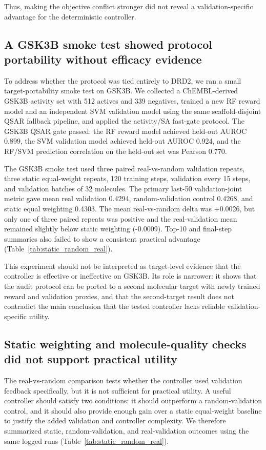 \documentclass[referee,lineno,pdflatex,sn-basic]{sn-jnl}
\theoremstyle{thmstyleone}%
\theoremstyle{thmstyletwo}%
\theoremstyle{thmstylethree}%
\begin{document}
Thus, making the objective conflict stronger did not reveal a validation-specific advantage for the deterministic controller.

\subsection{A GSK3B smoke test showed protocol portability without efficacy evidence}\label{subsec:gsk3b_smoke}

To address whether the protocol was tied entirely to DRD2, we ran a small target-portability smoke test on GSK3B. We collected a ChEMBL-derived GSK3B activity set with 512 actives and 339 negatives, trained a new RF reward model and an independent SVM validation model using the same scaffold-disjoint QSAR fallback pipeline, and applied the activity/SA fast-gate protocol. The GSK3B QSAR gate passed: the RF reward model achieved held-out AUROC 0.899, the SVM validation model achieved held-out AUROC 0.924, and the RF/SVM prediction correlation on the held-out set was Pearson 0.770.

The GSK3B smoke test used three paired real-vs-random validation repeats, three static equal-weight repeats, 120 training steps, validation every 15 steps, and validation batches of 32 molecules. The primary last-50 validation-joint metric gave mean real validation 0.4294, random-validation control 0.4268, and static equal weighting 0.4303. The mean real-vs-random delta was +0.0026, but only one of three paired repeats was positive and the real-validation mean remained slightly below static weighting (-0.0009). Top-10 and final-step summaries also failed to show a consistent practical advantage (Table~\ref{tab:static_random_real}).

This experiment should not be interpreted as target-level evidence that the controller is effective or ineffective on GSK3B. Its role is narrower: it shows that the audit protocol can be ported to a second molecular target with newly trained reward and validation proxies, and that the second-target result does not contradict the main conclusion that the tested controller lacks reliable validation-specific utility.

\subsection{Static weighting and molecule-quality checks did not support practical utility}\label{subsec:static_quality}

The real-vs-random comparison tests whether the controller used validation feedback specifically, but it is not sufficient for practical utility. A useful controller should satisfy two conditions: it should outperform a random-validation control, and it should also provide enough gain over a static equal-weight baseline to justify the added validation and controller complexity. We therefore summarized static, random-validation, and real-validation outcomes using the same logged runs (Table~\ref{tab:static_random_real}).
\end{document}

